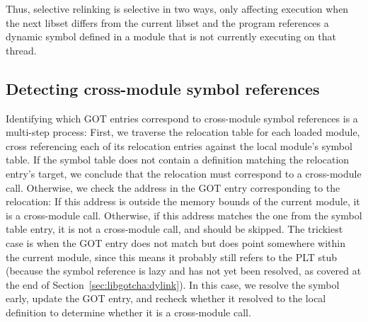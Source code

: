 \begin{promotesubsections}
\begin{swallowsections}





Thus, selective relinking is selective in two ways, only affecting execution when the
next libset differs from the current libset and the program references a dynamic
symbol defined in a module that is not currently executing on that thread.

\end{swallowsections}
\end{promotesubsections}


\subsection{Detecting cross-module symbol references}

Identifying which GOT entries correspond to cross-module symbol references is a
multi-step process:
First, we traverse the relocation table for each loaded module, cross referencing
each of its relocation entries against the local module's symbol table.  If the
symbol table does not contain a definition matching the relocation entry's target, we
conclude that the relocation must correspond to a cross-module call.  Otherwise, we
check the address in the GOT entry corresponding to the relocation:  If this address
is outside the memory bounds of the current module, it is a cross-module call.
Otherwise, if this address matches the one from the symbol table entry, it is not a
cross-module call, and should be skipped.  The trickiest case is when the GOT entry
does not match but does point somewhere within the current module, since this means
it probably still refers to the PLT stub (because the symbol reference is lazy and
has not yet been resolved, as covered at the end of
Section~\ref{sec:libgotcha:dylink}).  In this case, we resolve the symbol early,
update the GOT entry, and recheck whether it resolved to the local definition to
determine whether it is a cross-module call.


